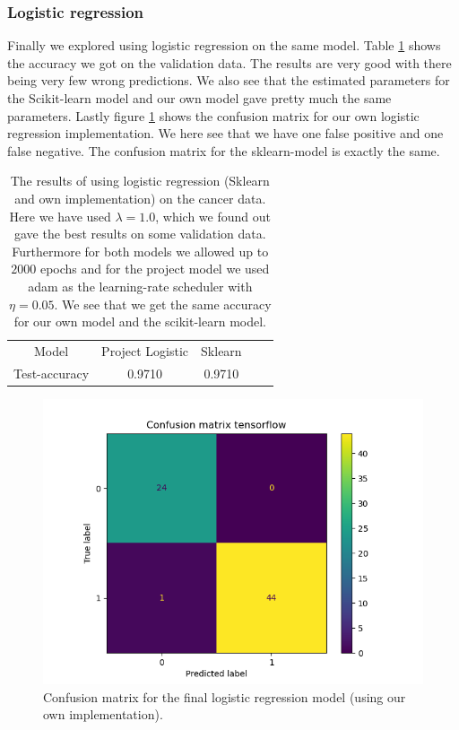 \documentclass{article}
\begin{document}
\subsubsection{Logistic regression}
Finally we explored using logistic regression on the same model. Table
\ref{breastcancer-logistic-results} shows the accuracy we got on the validation
data. The results are very good with there being very few wrong predictions. We
also see that the estimated parameters for the Scikit-learn model and our own
model gave pretty much the same parameters. Lastly figure
\ref{confusion-logistic-own} shows the confusion matrix for our own logistic
regression implementation. We here see that we have one false positive and one
false negative. The confusion matrix for the sklearn-model is exactly the same.

\begin{table}
      \centering
      \begin{tabular}{| c | c | c | c | c |}
            Model         & Project Logistic & Sklearn \\
            Test-accuracy & 0.9710           & 0.9710  \\
      \end{tabular}
      \caption{The results of using logistic regression (Sklearn and own
            implementation) on the cancer data. Here we have used $\lambda = 1.0$,
            which we found out gave the best results on some validation data.
            Furthermore for both models we allowed up to $2000$ epochs and for
            the project model we used adam as the learning-rate scheduler with
            $\eta = 0.05$. We see that we get the same accuracy for our own
            model and the scikit-learn model.}
      \label{breastcancer-logistic-results}
\end{table}

\begin{figure}
      \centering
      \includegraphics[scale=0.8]{confusion_matrix_tensorflow}
      \caption{Confusion matrix for the final logistic regression model (using
            our own implementation).}
      \label{confusion-logistic-own}
\end{figure}
\end{document}
